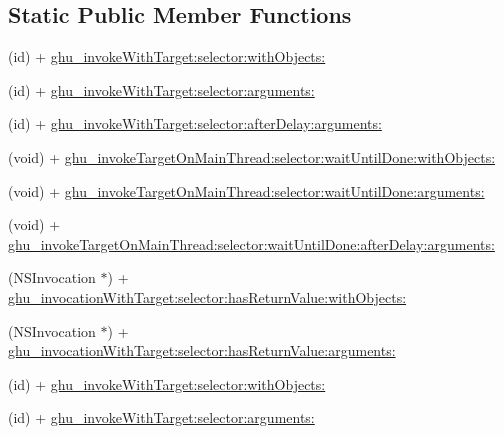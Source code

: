 \subsection*{\-Static \-Public \-Member \-Functions}
\begin{DoxyCompactItemize}
\item 
(id) + \hyperlink{interface_n_s_invocation_07_g_h_utils___g_h_u_n_i_t_08_af60de644c62297e237a21adf2ea75e80}{ghu\-\_\-invoke\-With\-Target\-:selector\-:with\-Objects\-:}
\item 
(id) + \hyperlink{interface_n_s_invocation_07_g_h_utils___g_h_u_n_i_t_08_a0aa9a0433b00c60a8174c7bed363821f}{ghu\-\_\-invoke\-With\-Target\-:selector\-:arguments\-:}
\item 
(id) + \hyperlink{interface_n_s_invocation_07_g_h_utils___g_h_u_n_i_t_08_a7f856b1af207762c610e597941411091}{ghu\-\_\-invoke\-With\-Target\-:selector\-:after\-Delay\-:arguments\-:}
\item 
(void) + \hyperlink{interface_n_s_invocation_07_g_h_utils___g_h_u_n_i_t_08_a6933a1f0fd7d0d4b8f133baf53f30a31}{ghu\-\_\-invoke\-Target\-On\-Main\-Thread\-:selector\-:wait\-Until\-Done\-:with\-Objects\-:}
\item 
(void) + \hyperlink{interface_n_s_invocation_07_g_h_utils___g_h_u_n_i_t_08_a261cd5aa6061478716fba4f79cb4f69b}{ghu\-\_\-invoke\-Target\-On\-Main\-Thread\-:selector\-:wait\-Until\-Done\-:arguments\-:}
\item 
(void) + \hyperlink{interface_n_s_invocation_07_g_h_utils___g_h_u_n_i_t_08_a0b891f27c084f6677907e0f907caf5f9}{ghu\-\_\-invoke\-Target\-On\-Main\-Thread\-:selector\-:wait\-Until\-Done\-:after\-Delay\-:arguments\-:}
\item 
(\-N\-S\-Invocation $\ast$) + \hyperlink{interface_n_s_invocation_07_g_h_utils___g_h_u_n_i_t_08_a31d3598ec7e21face3cb783c2c60b42c}{ghu\-\_\-invocation\-With\-Target\-:selector\-:has\-Return\-Value\-:with\-Objects\-:}
\item 
(\-N\-S\-Invocation $\ast$) + \hyperlink{interface_n_s_invocation_07_g_h_utils___g_h_u_n_i_t_08_a64dcd5d1f117118b02213db0846092d9}{ghu\-\_\-invocation\-With\-Target\-:selector\-:has\-Return\-Value\-:arguments\-:}
\item 
(id) + \hyperlink{interface_n_s_invocation_07_g_h_utils___g_h_u_n_i_t_08_af60de644c62297e237a21adf2ea75e80}{ghu\-\_\-invoke\-With\-Target\-:selector\-:with\-Objects\-:}
\item 
(id) + \hyperlink{interface_n_s_invocation_07_g_h_utils___g_h_u_n_i_t_08_a0aa9a0433b00c60a8174c7bed363821f}{ghu\-\_\-invoke\-With\-Target\-:selector\-:arguments\-:}

\end{DoxyCompactItemize}
